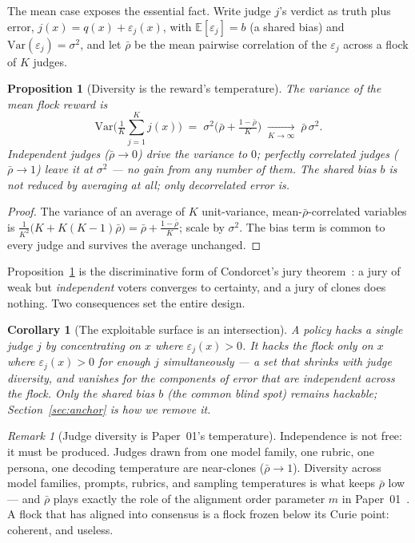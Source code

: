 \documentclass[11pt]{article}
\newtheorem{proposition}{Proposition}
\newtheorem{corollary}{Corollary}
\theoremstyle{definition}
\theoremstyle{remark}
\newtheorem{remark}{Remark}
\newcommand{\E}{\mathbb{E}}
\begin{document}
The mean case exposes the essential fact. Write judge $j$'s verdict as truth plus error,
$j(x)=q(x)+\varepsilon_j(x)$, with $\E[\varepsilon_j]=b$ (a shared bias) and
$\mathrm{Var}(\varepsilon_j)=\sigma^2$, and let $\bar\rho$ be the mean pairwise correlation of the
$\varepsilon_j$ across a flock of $K$ judges.

\begin{proposition}[Diversity is the reward's temperature]
\label{prop:condorcet}
The variance of the mean flock reward is
\[
  \mathrm{Var}\!\Big(\tfrac1K\textstyle\sum_{j=1}^K j(x)\Big)
  \;=\; \sigma^2\Big(\bar\rho + \tfrac{1-\bar\rho}{K}\Big)
  \;\xrightarrow[K\to\infty]{}\; \bar\rho\,\sigma^2 .
\]
Independent judges ($\bar\rho\to 0$) drive the variance to $0$; perfectly correlated judges
($\bar\rho\to 1$) leave it at $\sigma^2$ --- no gain from any number of them. The shared bias $b$ is
\emph{not} reduced by averaging at all; only decorrelated error is.
\end{proposition}

\begin{proof}
The variance of an average of $K$ unit-variance, mean-$\bar\rho$-correlated variables is
$\frac1{K^2}\big(K + K(K-1)\bar\rho\big)=\bar\rho+\frac{1-\bar\rho}{K}$; scale by $\sigma^2$. The bias term
is common to every judge and survives the average unchanged.
\end{proof}

Proposition~\ref{prop:condorcet} is the discriminative form of Condorcet's jury
theorem~\cite{condorcet1785}: a jury of weak but \emph{independent} voters converges to certainty, and a
jury of clones does nothing. Two consequences set the entire design.

\begin{corollary}[The exploitable surface is an intersection]
\label{cor:intersection}
A policy hacks a single judge $j$ by concentrating on $x$ where $\varepsilon_j(x)>0$. It hacks the flock
only on $x$ where $\varepsilon_j(x)>0$ for enough $j$ simultaneously --- a set that shrinks with judge
diversity, and vanishes for the components of error that are independent across the flock. Only the shared
bias $b$ (the common blind spot) remains hackable; Section~\ref{sec:anchor} is how we remove it.
\end{corollary}

\begin{remark}[Judge diversity is Paper~01's temperature]
Independence is not free: it must be produced. Judges drawn from one model family, one rubric, one
persona, one decoding temperature are near-clones ($\bar\rho\to1$). Diversity across model families,
prompts, rubrics, and sampling temperatures is what keeps $\bar\rho$ low --- and $\bar\rho$ plays exactly
the role of the alignment order parameter $m$ in Paper~01~\cite{hanzo-mfa}. A flock that has aligned into
consensus is a flock frozen below its Curie point: coherent, and useless.
\end{remark}
\end{document}
